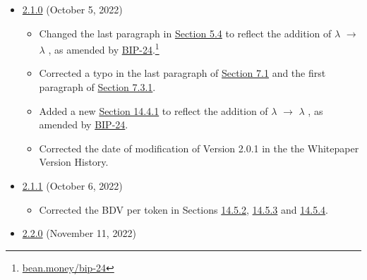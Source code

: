 \documentclass[class=article, crop=false]{standalone}
\begin{document}
\begin{itemize}[topsep=0pt, itemsep=3pt,leftmargin=16pt]
    \item \href{https://github.com/BeanstalkFarms/Beanstalk-Whitepaper/blob/master/version-history/beanstalk2_1_0.pdf}{2.1.0} (October 5, 2022)
        
    \begin{itemize}
        \item Changed the last paragraph in \hyperlink{subsection.5.4}{Section 5.4} to reflect the addition of $\lambda$ $\rightarrow$ $\lambda$ , as amended by \href{https://bean.money/bip-24}{BIP-24}.\footnote{\href{https://bean.money/bip-24}{bean.money/bip-24}}
        \item Corrected a typo in the last paragraph of \hyperlink{subsection.7.1}{Section 7.1} and the first paragraph of \hyperlink{subsubsection.7.3.1}{Section 7.3.1}.
        \item Added a new \hyperlink{subsubsection.14.4.1}{Section 14.4.1} to reflect the addition of $\lambda$ $\rightarrow$ $\lambda$ , as amended by \href{https://bean.money/bip-24}{BIP-24}.
        \item Corrected the date of modification of Version 2.0.1 in the the Whitepaper Version History.
    \end{itemize}  
    
    \newpage
    
    \item \href{https://github.com/BeanstalkFarms/Beanstalk-Whitepaper/blob/master/version-history/beanstalk2_1_1.pdf}{2.1.1} (October 6, 2022)
    
    \begin{itemize}
        \item Corrected the BDV per token in Sections \hyperlink{subsubsection.14.5.2}{14.5.2}, \hyperlink{subsubsection.14.5.3}{14.5.3} and \hyperlink{subsubsection.14.5.4}{14.5.4}.
    \end{itemize}
    
    \item \href{https://github.com/BeanstalkFarms/Beanstalk-Whitepaper/blob/master/version-history/beanstalk2_2_0.pdf}{2.2.0} (November 11, 2022)
    

\end{itemize}
\end{document}
